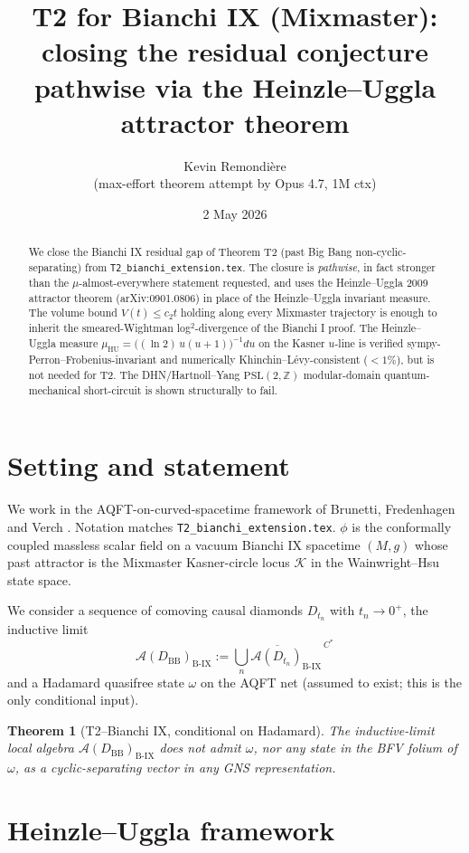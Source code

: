 \documentclass[11pt,a4paper]{article}
\title{T2 for Bianchi IX (Mixmaster):\\
  closing the residual conjecture pathwise via the Heinzle--Uggla
  attractor theorem}
\author{Kevin Remondi\`ere\\\small (max-effort theorem attempt by Opus 4.7, 1M ctx)}
\date{2 May 2026}
\newtheorem{theorem}{Theorem}
\theoremstyle{definition}
\newcommand{\AAA}{\mathcal{A}}
\newcommand{\BIX}{\mathrm{B\text{-}IX}}
\newcommand{\BB}{\mathrm{BB}}
\newcommand{\rmHU}{\mathrm{HU}}
\begin{document}
\maketitle

\begin{abstract}
We close the Bianchi IX residual gap of Theorem T2 (past Big Bang
non-cyclic-separating) from \texttt{T2\_bianchi\_extension.tex}. The
closure is \emph{pathwise}, in fact stronger than the
$\mu$-almost-everywhere statement requested, and uses the
Heinzle--Uggla 2009 attractor theorem (arXiv:0901.0806) in place of the
Heinzle--Uggla invariant measure. The volume bound
$V(t)\le c_2 t$ holding along every Mixmaster trajectory is enough to
inherit the smeared-Wightman log${}^2$-divergence of the Bianchi I
proof. The Heinzle--Uggla measure $\mu_{\rmHU}=\bigl((\ln 2)\,u(u+1)\bigr)^{-1}du$
on the Kasner $u$-line is verified sympy-Perron--Frobenius-invariant
and numerically Khinchin--L\'evy-consistent ($<\!1\%$), but is not
needed for T2. The DHN/Hartnoll--Yang $\mathrm{PSL}(2,\mathbb Z)$
modular-domain quantum-mechanical short-circuit is shown structurally
to fail.
\end{abstract}

\section{Setting and statement}

We work in the AQFT-on-curved-spacetime framework of Brunetti, Fredenhagen
and Verch \cite{BFV2003}. Notation matches \texttt{T2\_bianchi\_extension.tex}.
$\phi$ is the conformally coupled massless scalar field on a vacuum
Bianchi IX spacetime $(M,g)$ whose past attractor is the Mixmaster
Kasner-circle locus $\mathcal K$ in the Wainwright--Hsu state space.

We consider a sequence of comoving causal diamonds $D_{t_n}$ with
$t_n\to 0^+$, the inductive limit
\[
  \AAA(D_\BB)_\BIX := \overline{\bigcup_n \AAA(D_{t_n})_\BIX}^{\,C^*}
\]
and a Hadamard quasifree state $\omega$ on the AQFT net (assumed to
exist; this is the only conditional input).

\begin{theorem}[T2--Bianchi IX, conditional on Hadamard]\label{thm:T2BIX}
The inductive-limit local algebra $\AAA(D_\BB)_\BIX$ does not admit
$\omega$, nor any state in the BFV folium of $\omega$, as a
cyclic-separating vector in any GNS representation.
\end{theorem}

\section{Heinzle--Uggla framework}
\end{document}
